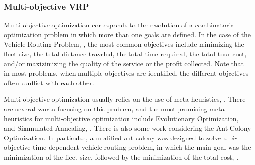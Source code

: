 \subsubsection{Multi-objective VRP}
\label{sec:multi-objetive-vrp}

Multi objective optimization corresponds to the resolution of a combinatorial optimization problem
in which more than one goals are defined. In the case of the Vehicle Routing Problem, \cite{multi_objective_vrp},
the most common objectives include minimizing the fleet size, the total distance traveled,
the total time required, the total tour cost, and/or maxizimizing the quality of the service
or the profit collected. Note that in most problems, when multiple objectives are identified,
the different objectives often conflict with each other.

Multi-objective optimization usually relies on the use of meta-heuristics, \cite{multi-objective-meta}.
There are several works focusing on this problem, and the most promising meta-heuristics 
for multi-objective optimization include Evolutionary Optimization, \cite{eo_multi_objective} and Simmulated Annealing, \cite{sa_multi_objective}.
There is also some work considering the Ant Colony Optimization.
In particular, a modified ant colony was designed to solve a bi-objective time dependent
vehicle routing problem, in which the main goal was the minimization of the fleet size,
followed by the minimization of the total cost, \cite{TDVRP_multi_objective_aco}.



